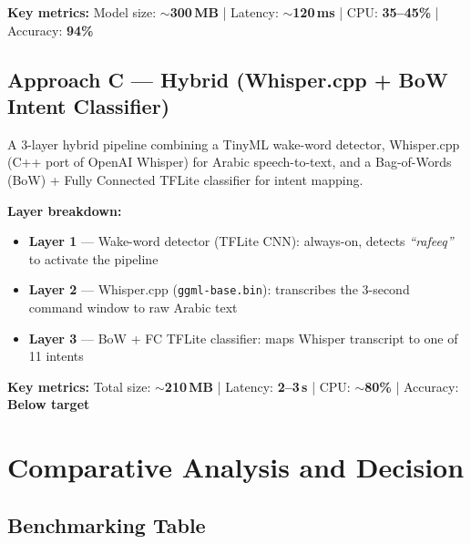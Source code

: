 \documentclass[12pt, a4paper]{report}
\begin{document}
\begin{mdframed}[backgroundcolor=lightblue, linecolor=steelblue, linewidth=1pt]
\textbf{Key metrics:} \quad
Model size: \textbf{$\sim$300\,MB} \quad|\quad
Latency: \textbf{$\sim$120\,ms} \quad|\quad
CPU: \textbf{35--45\%} \quad|\quad
Accuracy: \textbf{94\%}
\end{mdframed}

\section{Approach C --- Hybrid (Whisper.cpp + BoW Intent Classifier)}

A 3-layer hybrid pipeline combining a TinyML wake-word detector, Whisper.cpp (C++ port
of OpenAI Whisper) for Arabic speech-to-text, and a Bag-of-Words (BoW) + Fully
Connected TFLite classifier for intent mapping.

\textbf{Layer breakdown:}
\begin{itemize}[noitemsep]
  \item \textbf{Layer 1} --- Wake-word detector (TFLite CNN): always-on, detects
        \textit{``rafeeq''} to activate the pipeline
  \item \textbf{Layer 2} --- Whisper.cpp (\texttt{ggml-base.bin}): transcribes the
        3-second command window to raw Arabic text
  \item \textbf{Layer 3} --- BoW + FC TFLite classifier: maps Whisper transcript to
        one of 11 intents
\end{itemize}

\begin{mdframed}[backgroundcolor=lightblue, linecolor=steelblue, linewidth=1pt]
\textbf{Key metrics:} \quad
Total size: \textbf{$\sim$210\,MB} \quad|\quad
Latency: \textbf{2--3\,s} \quad|\quad
CPU: \textbf{$\sim$80\%} \quad|\quad
Accuracy: \textbf{Below target}
\end{mdframed}

\chapter{Comparative Analysis and Decision}

\section{Benchmarking Table}
\end{document}
